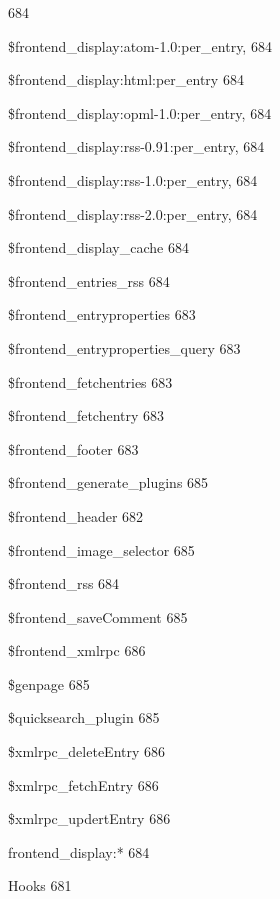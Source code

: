 \documentclass{book}
\renewcommand\subitem{\par}
\renewcommand\subsubitem{\par\hspace*{3mm}}
\begin{document}
\begin{multicols}{2}
\begin{osp-index}
		684
      \subsubitem \$frontend\_display:atom-1.0:per\_entry,\hspace{1mm} 
		684
      \subsubitem \$frontend\_display:html:per\_entry\hspace{1mm} 684
      \subsubitem \$frontend\_display:opml-1.0:per\_entry,\hspace{1mm} 
		684
      \subsubitem \$frontend\_display:rss-0.91:per\_entry,\hspace{1mm} 
		684
      \subsubitem \$frontend\_display:rss-1.0:per\_entry,\hspace{1mm} 
		684
      \subsubitem \$frontend\_display:rss-2.0:per\_entry,\hspace{1mm} 
		684
      \subsubitem \$frontend\_display\_cache\hspace{1mm} 684
      \subsubitem \$frontend\_entries\_rss\hspace{1mm} 684
      \subsubitem \$frontend\_entryproperties\hspace{1mm} 683
      \subsubitem \$frontend\_entryproperties\_query\hspace{1mm} 683
      \subsubitem \$frontend\_fetchentries\hspace{1mm} 683
      \subsubitem \$frontend\_fetchentry\hspace{1mm} 683
      \subsubitem \$frontend\_footer\hspace{1mm} 683
      \subsubitem \$frontend\_generate\_plugins\hspace{1mm} 685
      \subsubitem \$frontend\_header\hspace{1mm} 682
      \subsubitem \$frontend\_image\_selector\hspace{1mm} 685
      \subsubitem \$frontend\_rss\hspace{1mm} 684
      \subsubitem \$frontend\_saveComment\hspace{1mm} 685
      \subsubitem \$frontend\_xmlrpc\hspace{1mm} 686
      \subsubitem \$genpage\hspace{1mm} 685
      \subsubitem \$quicksearch\_plugin\hspace{1mm} 685
      \subsubitem \$xmlrpc\_deleteEntry\hspace{1mm} 686
      \subsubitem \$xmlrpc\_fetchEntry\hspace{1mm} 686
      \subsubitem \$xmlrpc\_updertEntry\hspace{1mm} 686
      \subsubitem frontend\_display:*\hspace{1mm} 684
    \subitem Hooks\hspace{1mm} 681

\end{osp-index}
\end{multicols}
\end{document}
